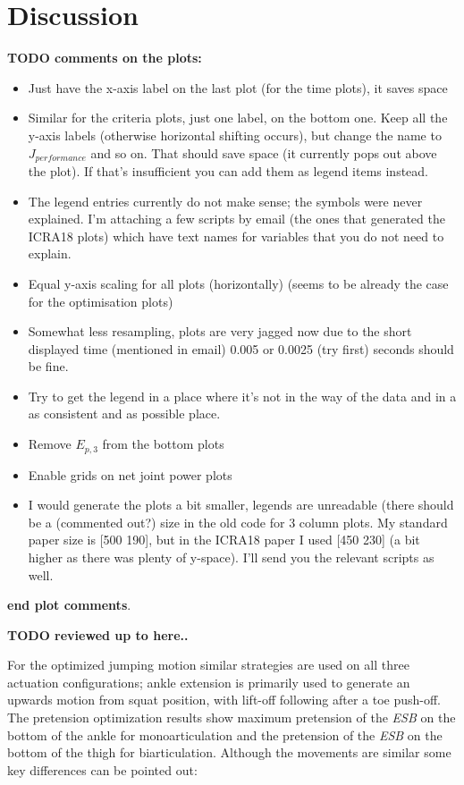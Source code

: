 \documentclass[letterpaper, 10 pt, conference]{ieeeconf}  %
\begin{document}
\section{Discussion} \label{sec:discussion}
\textbf{TODO comments on the plots:}
\begin{itemize}
	\item Just have the x-axis label on the last plot (for the time plots), it saves space
	\item Similar for the criteria plots, just one label, on the bottom one. Keep all the y-axis labels (otherwise horizontal shifting occurs), but change the name to $J_{performance}$ and so on. That should save space (it currently pops out above the plot). If that's insufficient you can add them as legend items instead.
	\item The legend entries currently do not make sense; the symbols were never explained. I'm attaching a few scripts by email (the ones that generated the ICRA18 plots) which have text names for variables that you do not need to explain.
	\item Equal y-axis scaling for all plots (horizontally) (seems to be already the case for the optimisation plots)
	\item Somewhat less resampling, plots are very jagged now due to the short displayed time (mentioned in email) 0.005 or 0.0025 (try first) seconds should be fine.
	\item Try to get the legend in a place where it's not in the way of the data and in a as consistent and as possible place.
	\item Remove $E_{p,3}$ from the bottom plots
	\item Enable grids on net joint power plots
	\item I would generate the plots a bit smaller, legends are unreadable (there should be a (commented out?) size in the old code for 3 column plots. My standard paper size is [500 190], but in the ICRA18 paper I used [450 230] (a bit higher as there was plenty of y-space). I'll send you the relevant scripts as well.
\end{itemize}
\textbf{end plot comments}.

\textbf{TODO reviewed up to here..}

For the optimized jumping motion similar strategies are used on all three actuation configurations; ankle extension is primarily used to generate an upwards motion from squat position, with lift-off following after a toe push-off. The pretension optimization results show maximum pretension of the \textit{ESB} on the bottom of the ankle for monoarticulation and the pretension of the \textit{ESB} on the bottom of the thigh for biarticulation. Although the movements are similar some key differences can be pointed out:
\end{document}
